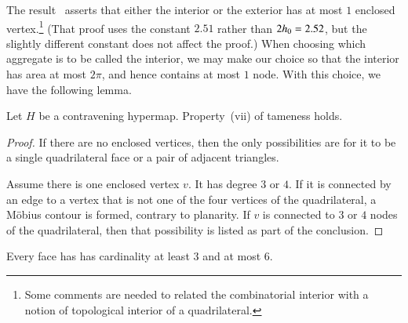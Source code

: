 The result~\cite[Lemma~4.2]{sp1} asserts that either the interior or the
exterior has at most $1$ enclosed vertex.\footnote{Some comments are needed to related the combinatorial interior with a notion of topological interior of a quadrilateral.}  (That proof uses the constant $2.51$ rather than $2{h_0}=2.52$, but the slightly different constant does not affect the proof.)   When choosing which
aggregate is to be called the interior, we may make our choice so
that the interior has area at most $2\pi$, and hence contains at
most $1$ node. With this choice, we have the following lemma.

\begin{lemma}
Let $H$ be a contravening hypermap. Property~(vii) of tameness
holds.
\end{lemma}

\begin{proof}
If there are no enclosed vertices, then the only possibilities are
for it to be a single quadrilateral face or a pair of adjacent
triangles.

Assume there is one enclosed vertex $v$.  It has degree $3$ or $4$.
If it is connected by an edge to a vertex that is not one of the
four vertices of the quadrilateral, a M\"obius contour is formed, contrary to planarity.
If $v$ is connected to $3$
or $4$ nodes of the quadrilateral, then that possibility is listed
as part of the conclusion.
\end{proof}

\begin{lemma}  Every face has has cardinality at least $3$ and at most $6$.
\end{lemma}

